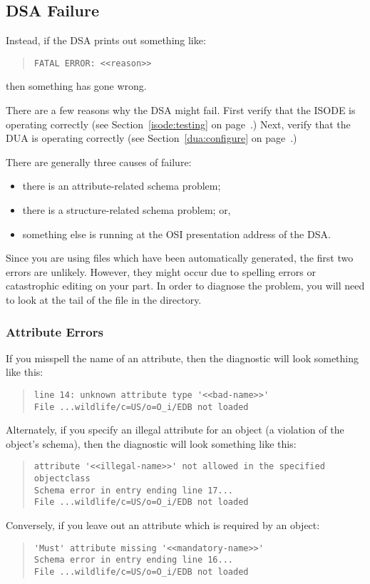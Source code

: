 \subsection	{DSA Failure}\label{dsa:failure}
Instead,
if the DSA prints out something like:
\begin{quote}\smaller\begin{verbatim}
FATAL ERROR: <<reason>>
\end{verbatim}\end{quote}
then something has gone wrong.

There are a few reasons why the DSA might fail.
First verify that the ISODE is operating correctly
(see Section~\ref{isode:testing} on page~\pageref{isode:testing}.)
Next, verify that the DUA is operating correctly
(see Section~\ref{dua:configure} on page~\pageref{dua:configure}.)

There are generally three causes of failure:
\begin{itemize}
\item	there is an attribute-related schema problem;

\item	there is a structure-related schema problem;
or,

\item	something else is running at the OSI presentation address of the DSA.
\end{itemize}
Since you are using files which have been automatically generated,
the first two errors are unlikely.
However,
they might occur due to spelling errors or catastrophic editing
on your part.
In order to diagnose the problem,
you will need to look at the tail of the file  in the
 directory.

\subsubsection	{Attribute Errors}
If you misspell the name of an attribute,
then the diagnostic will look something like this:
\begin{quote}\small\begin{verbatim}
line 14: unknown attribute type '<<bad-name>>'
File ...wildlife/c=US/o=O_i/EDB not loaded
\end{verbatim}\end{quote}
Alternately,
if you specify an illegal attribute for an object
(a violation of the object's schema),
then the diagnostic will look something like this:
\begin{quote}\small\begin{verbatim}
attribute '<<illegal-name>>' not allowed in the specified objectclass
Schema error in entry ending line 17...
File ...wildlife/c=US/o=O_i/EDB not loaded
\end{verbatim}\end{quote}
Conversely,
if you leave out an attribute which is required by an object:
\begin{quote}\small\begin{verbatim}
'Must' attribute missing '<<mandatory-name>>'
Schema error in entry ending line 16...
File ...wildlife/c=US/o=O_i/EDB not loaded
\end{verbatim}\end{quote}

